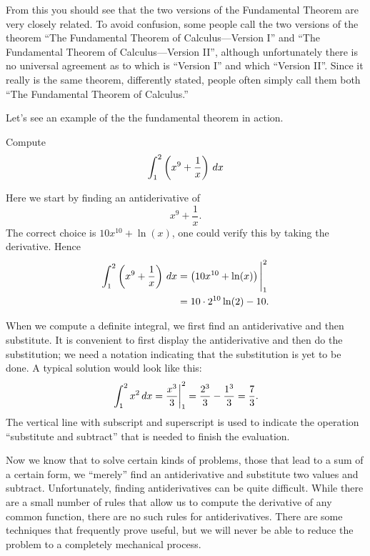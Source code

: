 From this you should see that the two versions of the Fundamental
Theorem are very closely related. To avoid confusion, some people call
the two versions of the theorem ``The Fundamental Theorem of
Calculus---Version I'' and ``The Fundamental Theorem of
Calculus---Version II'', although unfortunately there is no universal
agreement as to which is ``Version I'' and which ``Version II''. Since
it really is the same theorem, differently stated, people often simply
call them both ``The Fundamental Theorem of Calculus.''

Let's see an example of the the fundamental theorem in action.

\begin{example}
Compute
\[
\int_1^2\left(x^9 + \frac{1}{x}\right) \, d x
\]
\end{example}

\begin{solution}
Here we start by finding an antiderivative of 
\[
x^9 + \frac{1}{x}.
\]
The correct choice is $10x^{10} + \ln(x)$, one could verify this by
taking the derivative. Hence
\begin{align*}
\int_1^2\left(x^9 + \frac{1}{x}\right) \, d x &= \left(10x^{10} + \ln(x)\right)\Bigg|_1^2 \\
&= 10\cdot 2^{10} \ln(2) - 10.
\end{align*}
\end{solution}


When we compute a definite integral, we first find an antiderivative
and then substitute. It is convenient to first display the
antiderivative and then do the substitution; we need a notation
indicating that the substitution is yet to be done. A typical solution
would look like this:
\[
  \left.\int_1^2 x^2\, d x={x^3\over 3}\right|_1^2 = 
  {2^3\over3}-{1^3\over3}={7\over3}.
\]
The vertical line with subscript and superscript is used to indicate
the operation ``substitute and subtract'' that is needed to finish the
evaluation. 

Now we know that to solve certain kinds of problems, those that lead
to a sum of a certain form, we ``merely'' find an antiderivative and
substitute two values and subtract. Unfortunately, finding
antiderivatives can be quite difficult. While there are a small number
of rules that allow us to compute the derivative of any common
function, there are no such rules for antiderivatives. There are some
techniques that frequently prove useful, but we will never be able to
reduce the problem to a completely mechanical process.






